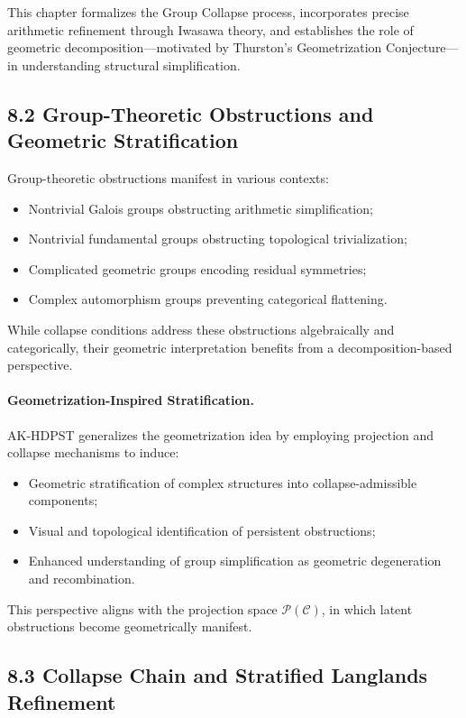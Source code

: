 \documentclass[11pt]{article}
\begin{document}
This chapter formalizes the Group Collapse process, incorporates precise arithmetic refinement through Iwasawa theory, and establishes the role of geometric decomposition—motivated by Thurston's Geometrization Conjecture—in understanding structural simplification.

\subsection*{8.2 Group-Theoretic Obstructions and Geometric Stratification}

Group-theoretic obstructions manifest in various contexts:

\begin{itemize}
    \item Nontrivial Galois groups obstructing arithmetic simplification;
    \item Nontrivial fundamental groups obstructing topological trivialization;
    \item Complicated geometric groups encoding residual symmetries;
    \item Complex automorphism groups preventing categorical flattening.
\end{itemize}

While collapse conditions address these obstructions algebraically and categorically, their geometric interpretation benefits from a decomposition-based perspective.

\paragraph{Geometrization-Inspired Stratification.}
AK-HDPST generalizes the geometrization idea by employing projection and collapse mechanisms to induce:

\begin{itemize}
    \item Geometric stratification of complex structures into collapse-admissible components;
    \item Visual and topological identification of persistent obstructions;
    \item Enhanced understanding of group simplification as geometric degeneration and recombination.
\end{itemize}

This perspective aligns with the projection space \( \mathcal{P}(\mathcal{C}) \), in which latent obstructions become geometrically manifest.

\subsection*{8.3 Collapse Chain and Stratified Langlands Refinement}
\end{document}
